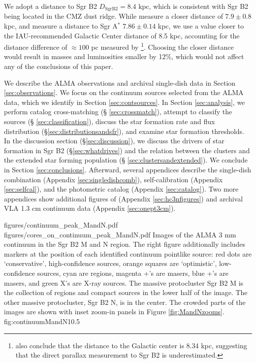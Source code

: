 \documentclass[twocolumn]{aastex61}
\newcommand{\dsgrb}{\ensuremath{8.4\textrm{~kpc}}\xspace}
\begin{document}
We adopt a distance to Sgr B2 $D_{\mathrm{Sgr B2}}=\dsgrb$, which is consistent
with Sgr B2 being located in the CMZ dust ridge.  While \citet{Reid2009a}
measure a closer distance of $7.9\pm0.8$ kpc, and \citet{Boehle2016a}
measure a distance to Sgr A$^*$ $7.86\pm0.14$ kpc, we use a value closer to the
IAU-recommended Galactic Center distance of 8.5 kpc, accounting for the
distance difference of $\approx100$ pc measured by
\citet{Reid2009a}\footnote{\citet{Reid2014a} also conclude that the distance to
the Galactic center is 8.34 kpc, suggesting that the direct parallax
measurement to Sgr B2 is underestimated.}.  Choosing the closer distance would
result in masses and luminosities smaller by 12\%, which would not affect any
of the conclusions of this paper.

We describe the ALMA observations and archival single-dish data in Section
\ref{sec:observations}. We focus on the continuum sources selected from the
ALMA data, which we identify in Section \ref{sec:contsources}.  In Section
\ref{sec:analysis}, we perform catalog cross-matching (\S
\ref{sec:crossmatch}), attempt to classify the sources (\S
\ref{sec:classification}), discuss the star formation rate and flux
distribution (\S \ref{sec:distributionsandsfr}), and examine star formation
thresholds.  In the discussion section (\S \ref{sec:discussion}), we discuss
the drivers of star formation in Sgr B2 (\S \ref{sec:whatdrives}) and the
relation between the clusters and the extended star forming population (\S
\ref{sec:clustersandextended}).  We conclude in Section \ref{sec:conclusions}.
Afterward, several appendices describe the single-dish combination (Appendix
\ref{sec:singledishcomb}), self-calibration (Appendix \ref{sec:selfcal}), and
the photometric catalog (Appendix \ref{sec:catalog}).  Two more appendices show
additional figures of \cyanoacetylene (Appendix \ref{sec:hc3nfigures}) and
archival VLA 1.3 cm continuum data (Appendix \ref{sec:onept3cm}).


\FigureTwo
{figures/continuum_peak_MandN.pdf}
{figures/cores_on_continuum_peak_MandN.pdf}
{Images of the ALMA 3 mm continuum in the Sgr B2 M and N region.  The right
figure additionally includes markers at the position of each identified
continuum pointlike source: red dots are `conservative', high-confidence
sources, orange squares are `optimistic', low-confidence sources, cyan are \hii
regions, magenta +'s are \methanol masers, blue +'s are \water masers, and
green X's are X-ray sources.  The massive
protocluster Sgr B2 M is the collection of \hii regions and compact sources in
the lower half of the image.  The other massive protocluster, Sgr B2 N, is in
the center.
The crowded parts of the images are shown with inset zoom-in panels in
Figure \ref{fig:MandNzooms}.
}
{fig:continuumMandN}{1}{0.5\textwidth}
\end{document}
